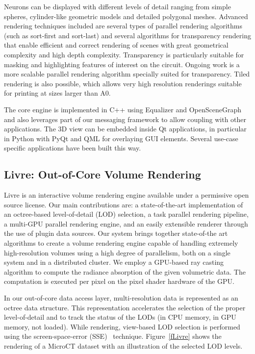 \documentclass[10pt]{llncs}
\newcommand{\fig}[1]{Figure~\ref{#1}}
\begin{document}
Neurons can be displayed with different levels of detail ranging from simple
spheres, cylinder-like geometric models and detailed polygonal
meshes. Advanced rendering techniques included are several types of parallel
rendering algorithms (such as sort-first and sort-last) and several algorithms
for transparency rendering that enable efficient and correct rendering of
scenes with great geometrical complexity and high depth
complexity. Transparency is particularly suitable for masking and highlighting
features of interest on the circuit. Ongoing work is a more scalable parallel
rendering algorithm specially suited for transparency. Tiled rendering is also
possible, which allows very high resolution renderings suitable for printing
at sizes larger than A0.

The core engine is implemented in C++ using Equalizer and OpenSceneGraph and
also leverages part of our messaging framework to allow coupling with other
applications. The 3D view can be embedded inside Qt applications, in particular
in Python with PyQt and QML for overlaying GUI elements. Several use-case
specific applications have been built this way.

\subsection{Livre: Out-of-Core Volume Rendering}

Livre is an interactive volume rendering engine available under a permissive
open source license. Our main contributions are: a state-of-the-art
implementation of an octree-based level-of-detail (LOD) selection, a task
parallel rendering pipeline, a multi-GPU parallel rendering engine, and an
easily extensible renderer through the use of plugin data sources. Our system
brings together state-of-the art algorithms to create a volume rendering engine
capable of handling extremely high-resolution volumes using a high degree of
parallelism, both on a single system and in a distributed cluster. We employ a
GPU-based ray casting algorithm to compute the radiance absorption of the given
volumetric data. The computation is executed per pixel on the pixel shader
hardware of the GPU.

In our out-of-core data access layer, multi-resolution data is represented as an
octree data structure. This representation accelerates the selection of the
proper level-of-detail and to track the status of the LODs (in CPU memory, in
GPU memory, not loaded). While rendering, view-based LOD selection is performed
using the screen-space-error (SSE)~\cite{guthe2004} technique. \fig{fLivre}
shows the rendering of a MicroCT dataset with an illustration of the selected
LOD levels.
\end{document}
